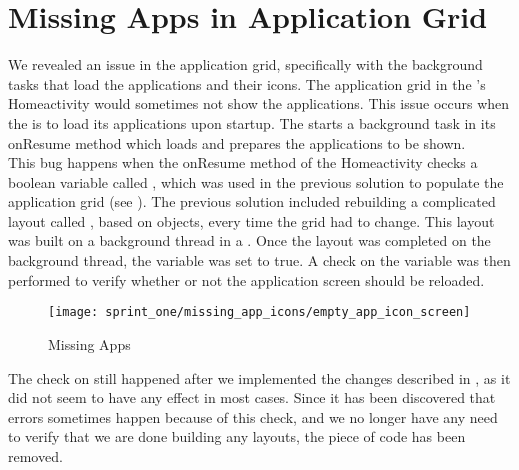 
\section{Missing Apps in Application Grid}
\label{sec:missing_apps_racecondition}

We revealed an issue in the application grid, specifically with the background tasks that load the applications and their icons. The application grid in the \launcher's Homeactivity would sometimes not show the applications. This issue occurs when the \launcher is to load its applications upon startup. The \launcher starts a background task in its onResume method which loads and prepares the applications to be shown.\\

This bug happens when the onResume method of the Homeactivity checks a boolean variable called , which was used in the previous solution to populate the application grid (see ). The previous solution included rebuilding a complicated layout called , based on  objects, every time the grid had to change. This layout was built on a background thread in a . Once the layout was completed on the background thread, the variable  was set to true. A check on the variable was then performed to verify whether or not the application screen should be reloaded. \\

\begin{figure}[!htbp]
    \centering
    \texttt{[image: sprint\_one/missing\_app\_icons/empty\_app\_icon\_screen]}
    \caption{Missing Apps}
    \label{fig:missing_apps}
\end{figure}

The check on  still happened after we implemented the changes described in , as it did not seem to have any effect in most cases. Since it has been discovered that errors sometimes happen because of this check, and we no longer have any need to verify that we are done building any layouts, the piece of code has been removed. \\